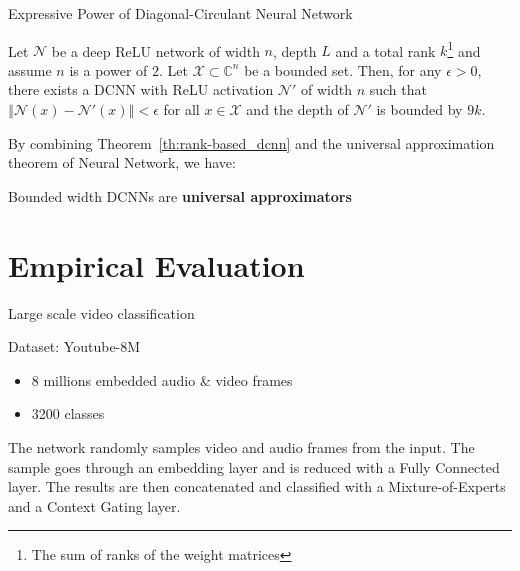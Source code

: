 \documentclass[9pt]{beamer}
\begin{document}
\begin{frame}{Expressive Power of Diagonal-Circulant Neural Network}


\begin{theorem} \label{th:rank-based_dcnn}
Let $\mathcal{N}$ be a deep ReLU network of width $n$, depth $L$ and a total rank $k$\footnote{The sum of ranks of the weight matrices} and assume $n$ is a power of $2$. Let $\mathcal{X} \subset \mathbb{C}^{n}$ be a bounded set. Then, for any $\epsilon>0$, there exists a DCNN with ReLU activation $\mathcal{N}'$ of width $n$ such that $\left\Vert \mathcal{N}(x)-\mathcal{N}'(x)\right\Vert <\epsilon$ for all $x\in\mathcal{X}$ and the depth of $\mathcal{N}'$ is bounded by $9k$.
\end{theorem}

By combining Theorem~\ref{th:rank-based_dcnn} and the universal approximation theorem of Neural Network, we have:

\begin{corollary} \label{th:universal}
Bounded width DCNNs are \textbf{universal approximators} 
\end{corollary}

\end{frame}




\section{Empirical Evaluation}

\begin{frame}{Large scale video classification}

\begin{block}{Dataset: Youtube-8M}
\begin{itemize}
    \item 8 millions embedded audio \& video frames
    \item 3200 classes
\end{itemize}
\end{block}

The network randomly samples video and audio frames from the input. The sample goes through an embedding layer and is reduced with a Fully Connected layer. The results are then concatenated and classified with a Mixture-of-Experts and a Context Gating layer.
\begin{figure}[htb]
  \scalebox{0.65}{}
\end{figure}
\end{frame}
\end{document}
